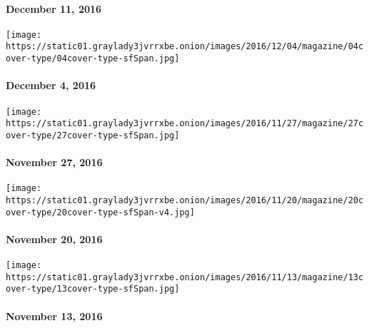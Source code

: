 \hypertarget{december-11-2016}{%
\paragraph{December 11, 2016}\label{december-11-2016}}

\href{http://www.nytimes3xbfgragh.onion/indexes/2016/12/04/magazine/index.html}{}

\texttt{[image: https://static01.graylady3jvrrxbe.onion/images/2016/12/04/magazine/04cover-type/04cover-type-sfSpan.jpg]}

\hypertarget{december-4-2016}{%
\paragraph{December 4, 2016}\label{december-4-2016}}

\href{http://www.nytimes3xbfgragh.onion/indexes/2016/11/27/magazine/index.html}{}

\texttt{[image: https://static01.graylady3jvrrxbe.onion/images/2016/11/27/magazine/27cover-type/27cover-type-sfSpan.jpg]}

\hypertarget{november-27-2016}{%
\paragraph{November 27, 2016}\label{november-27-2016}}

\href{http://www.nytimes3xbfgragh.onion/indexes/2016/11/20/magazine/index.html}{}

\texttt{[image: https://static01.graylady3jvrrxbe.onion/images/2016/11/20/magazine/20cover-type/20cover-type-sfSpan-v4.jpg]}

\hypertarget{november-20-2016}{%
\paragraph{November 20, 2016}\label{november-20-2016}}

\href{http://www.nytimes3xbfgragh.onion/indexes/2016/11/13/magazine/index.html}{}

\texttt{[image: https://static01.graylady3jvrrxbe.onion/images/2016/11/13/magazine/13cover-type/13cover-type-sfSpan.jpg]}

\hypertarget{november-13-2016}{%
\paragraph{November 13, 2016}\label{november-13-2016}}

\href{http://www.nytimes3xbfgragh.onion/indexes/2016/11/06/magazine/index.html}{}

